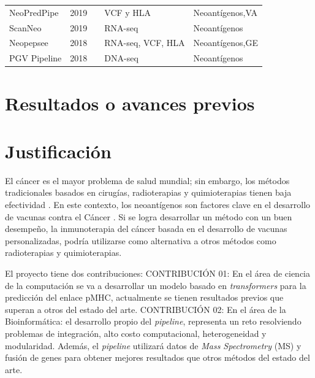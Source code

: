 \documentclass[a4paper,11pt]{article}
\begin{document}
\begin{table}[h]
{{\begin{tabular}{lllp{4.5cm}p{2.7cm}}
	NeoPredPipe     & 2019 &\cite{schenck2019neopredpipe}     & VCF y HLA                            & Neoantígenos,VA              \\
	
	ScanNeo         & 2019 &\cite{wang2019scanneo}            & RNA-seq                                                  & Neoantígenos                                       \\
	
		
	Neopepsee       & 2018 &\cite{kim2018neopepsee}           & RNA-seq, VCF, HLA  & Neoantígenos,GE    \\ 
	
	PGV Pipeline    & 2018 &\cite{rubinsteyn2018computational}& DNA-seq                                                  & Neoantígenos                                       \\
	

\end{tabular}
}	
}
\end{table}






\section{Resultados o avances previos}

\section{Justificación}

El cáncer es el mayor problema de salud mundial; sin embargo, los métodos tradicionales basados en cirugías, radioterapias y quimioterapias tienen baja efectividad \citep{peng2019neoantigen}. En este contexto, los neoantígenos son factores clave en el desarrollo de vacunas contra el Cáncer  \citep{borden2022cancer,chen2021challenges,gopanenko2020main}. Si se logra desarrollar un método con un buen desempeño, la inmunoterapia del cáncer basada en el desarrollo de vacunas personalizadas, podría utilizarse como alternativa a otros métodos como radioterapias y quimioterapias. 

El proyecto tiene dos contribuciones: CONTRIBUCIÓN 01: En el área de ciencia de la computación se va a desarrollar un modelo basado en \textit{transformers} para la predicción del enlace pMHC, actualmente se tienen resultados previos que superan a otros del estado del arte. CONTRIBUCIÓN 02: En el área de la Bioinformática: el desarrollo propio del \textit{pipeline}, representa un reto resolviendo problemas de integración, alto costo computacional, heterogeneidad y modularidad. Además,  el \textit{pipeline} utilizará datos de \textit{Mass Spectrometry} (MS) y fusión de genes para obtener mejores resultados que otros métodos del estado del arte.
\end{document}
